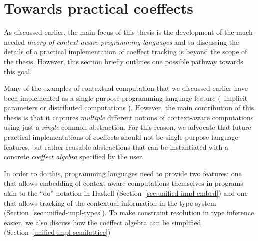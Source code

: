 %                                                                   
%                                                                

\section{Towards practical coeffects}
\label{sec:unified-impl}

As discussed earlier, the main focus of this thesis is the development of the much needed 
\emph{theory of context-aware programming languages} and so discussing the details of a practical 
implementation of coeffect tracking is beyond the scope of the thesis. However, this section
briefly outlines one possible pathway towards this goal.

Many of the examples of contextual computation that we discussed earlier have been implemented as 
a single-purpose programming language feature (\eg~implicit parameters \cite{app-implicit-parameters} 
or distributed computations \cite{app-distributed-ml5,app-distributed-links}). However, 
the main contribution of this thesis is that it captures
\emph{multiple} different notions of context-aware computations using just a \emph{single}
common abstraction. For this reason, we advocate that future practical implementations of
coeffects should not be single-purpose language features, but rather reusable abstractions that
can be instantiated with a concrete \emph{coeffect algebra} specified by the user.

In order to do this, programming languages need to provide two features; one that allows 
embedding of context-aware computations themselves in programs akin to the ``do'' notation
in Haskell (Section~\ref{sec:unified-impl-embed}) and one that allows tracking of the 
contextual information in the type system (Section~\ref{sec:unified-impl-types}). To make
constraint resolution in type inference easier, we also discuss how the coeffect algebra 
can be simplified (Section~\ref{unified-impl-semilattice})

